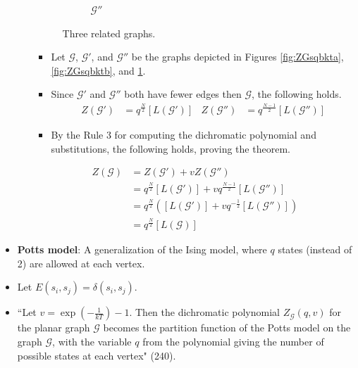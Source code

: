 \documentclass[titlepage]{article}
\numberwithin{figure}{section}
\numberwithin{table}{section}
\numberwithin{equation}{section}
\newcommand{\dq}[2]{``#1" (#2).}
\begin{document}
\begin{itemize}
\begin{itemize}
\begin{figure}[h!]
\begin{subfigure}[b]{0.15\linewidth}
                \caption{$\mathcal{G}''$}
                \label{fig:ZGsqbktc}
            \end{subfigure}
            \caption{Three related graphs.}
            \label{fig:ZGsqbkt}
        \end{figure}
        \begin{itemize}
            \item Let $\mathcal{G}$, $\mathcal{G}'$, and $\mathcal{G}''$ be the graphs depicted in Figures \ref{fig:ZGsqbkta}, \ref{fig:ZGsqbktb}, and \ref{fig:ZGsqbktc}.
            \item Since $\mathcal{G}'$ and $\mathcal{G}''$ both have fewer edges then $\mathcal{G}$, the following holds.
            \begin{align*}
                Z(\mathcal{G}') &= q^\frac{N}{2}[L(\mathcal{G}')]&
                Z(\mathcal{G}'') &= q^\frac{N-1}{2}[L(\mathcal{G}'')]
            \end{align*}
            \item By the Rule 3 for computing the dichromatic polynomial and substitutions, the following holds, proving the theorem.
        \end{itemize}
        \begin{align*}
            Z(\mathcal{G}) &= Z(\mathcal{G}')+vZ(\mathcal{G}'')\\
            &= q^\frac{N}{2}[L(\mathcal{G}')]+vq^\frac{N-1}{2}[L(\mathcal{G}'')]\\
            &= q^\frac{N}{2}\left( [L(\mathcal{G}')]+vq^{-\frac{1}{2}}[L(\mathcal{G}'')] \right)\\
            &= q^\frac{N}{2}[L(\mathcal{G})]
        \end{align*}
    \end{itemize}
    \item \textbf{Potts model}: A generalization of the Ising model, where $q$ states (instead of 2) are allowed at each vertex.
    \item Let $E(s_i,s_j)=\delta(s_i,s_j)$.
    \item \dq{Let $v=\exp\left( -\frac{1}{kT} \right)-1$. Then the dichromatic polynomial $Z_\mathcal{G}(q,v)$ for the planar graph $\mathcal{G}$ becomes the partition function of the Potts model on the graph $\mathcal{G}$, with the variable $q$ from the polynomial giving the number of possible states at each vertex}{240}

\end{itemize}
\end{document}
